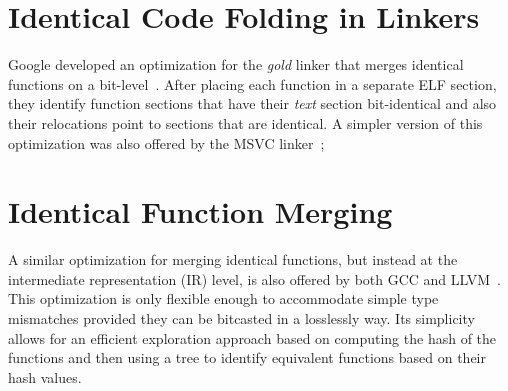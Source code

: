 
\section{Identical Code Folding in Linkers}

Google developed an optimization for the \textit{gold} linker that merges
identical functions on a bit-level~\cite{tallam10,kwan12}.
After placing each function in a separate ELF section, they identify function
sections that have their \textit{text} section bit-identical and also their
relocations point to sections that are identical. A simpler version of this
optimization was also offered by the MSVC linker~\cite{msvc-icf};

\section{Identical Function Merging}


A similar optimization for merging identical functions, but instead at the
intermediate representation (IR) level, is also offered by both GCC and
LLVM~\cite{llvm-fm,livska14}.
This optimization is only flexible enough to accommodate simple type mismatches
provided they can be bitcasted in a losslessly way.
Its simplicity allows for an efficient exploration approach based on computing
the hash of the functions and then using a tree to identify equivalent functions
based on their hash values.

